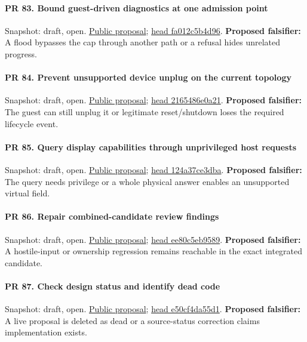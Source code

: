 \paragraph{PR 83. Bound guest-driven diagnostics at one admission point}
\readcode Snapshot: draft, open.
\href{\repobase/pull/83}{Public proposal};
\href{\repobase/commit/fa012c5b4d962e841e02b702907d4505409b3a94}{head fa012c5b4d96}.
\textbf{Proposed falsifier:} A flood bypasses the cap through another path or a refusal hides
  unrelated progress.

\paragraph{PR 84. Prevent unsupported device unplug on the current topology}
\readcode Snapshot: draft, open.
\href{\repobase/pull/84}{Public proposal};
\href{\repobase/commit/2165486e0a21985ce204d1776461a88c61af2d51}{head 2165486e0a21}.
\textbf{Proposed falsifier:} The guest can still unplug it or legitimate reset/shutdown loses the
  required lifecycle event.

\paragraph{PR 85. Query display capabilities through unprivileged host requests}
\readcode Snapshot: draft, open.
\href{\repobase/pull/85}{Public proposal};
\href{\repobase/commit/124a37ce3dba62fc70eea47c41bf5a74bf849e1c}{head 124a37ce3dba}.
\textbf{Proposed falsifier:} The query needs privilege or a whole physical answer enables an
  unsupported virtual field.

\paragraph{PR 86. Repair combined-candidate review findings}
\readcode Snapshot: draft, open.
\href{\repobase/pull/86}{Public proposal};
\href{\repobase/commit/ee80c5eb95891874704e33d7f30164bf8c47e26f}{head ee80c5eb9589}.
\textbf{Proposed falsifier:} A hostile-input or ownership regression remains reachable in the exact
  integrated candidate.

\paragraph{PR 87. Check design status and identify dead code}
\readcode Snapshot: draft, open.
\href{\repobase/pull/87}{Public proposal};
\href{\repobase/commit/e50cf4da55d129e985f6c18dc6093d096ada56d1}{head e50cf4da55d1}.
\textbf{Proposed falsifier:} A live proposal is deleted as dead or a source-status correction claims
  implementation exists.

